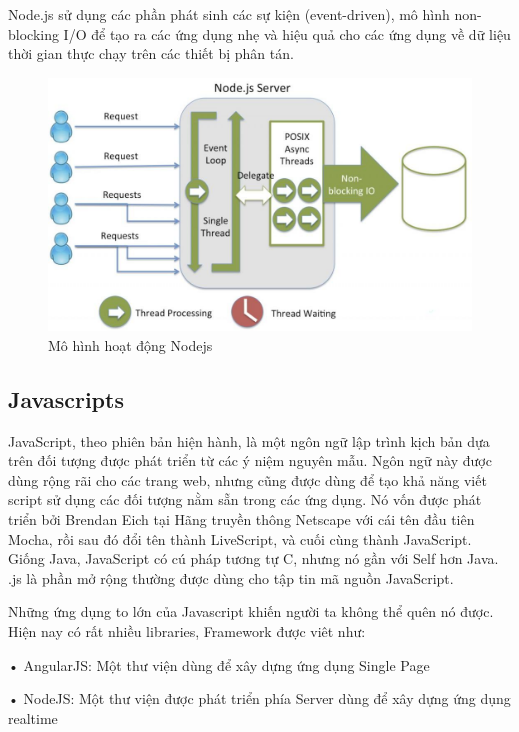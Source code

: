 Node.js sử dụng các phần phát sinh các sự kiện (event-driven), mô hình non-blocking I/O để tạo ra các ứng dụng nhẹ và hiệu quả cho các ứng dụng về dữ liệu thời gian thực chạy trên các thiết bị phân tán.

\begin{figure}[H]
	\centering    
	\includegraphics[width=1.0\textwidth]{nodejs1}
	\caption[Mô hình hoạt động Nodejs]{Mô hình hoạt động Nodejs}
	\label{fig: nodejs1}
\end{figure}

\subsection{Javascripts}
JavaScript, theo phiên bản hiện hành, là một ngôn ngữ lập trình kịch bản dựa trên đối tượng được phát triển từ các ý niệm nguyên mẫu. Ngôn ngữ này được dùng rộng rãi cho các trang web, nhưng cũng được dùng để tạo khả năng viết script sử dụng các đối tượng nằm sẵn trong các ứng dụng. Nó vốn được phát triển bởi Brendan Eich tại Hãng truyền thông Netscape với cái tên đầu tiên Mocha, rồi sau đó đổi tên thành LiveScript, và cuối cùng thành JavaScript. Giống Java, JavaScript có cú pháp tương tự C, nhưng nó gần với Self hơn Java. .js là phần mở rộng thường được dùng cho tập tin mã nguồn JavaScript.

Những ứng dụng to lớn của Javascript khiến người ta không thể quên nó được. Hiện nay có rất nhiều libraries, Framework được viêt như:

• AngularJS: Một thư viện dùng để xây dựng ứng dụng Single Page

• NodeJS: Một thư viện được phát triển phía Server dùng để xây dựng ứng dụng realtime

